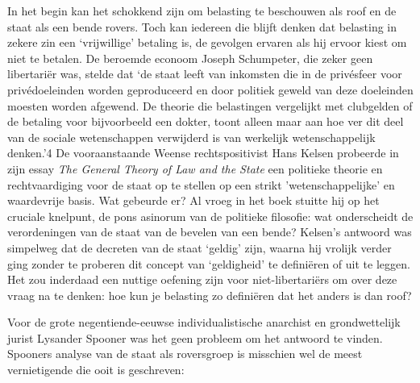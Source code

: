 \documentclass[
  a5paper,
  smalldemyvopaper,10pt,twoside,onecolumn,openright,extrafontsizes,hidelinks]{memoir}
\begin{document}
In het begin kan het schokkend zijn om belasting te beschouwen als roof
en de staat als een bende rovers. Toch kan iedereen die blijft denken
dat belasting in zekere zin een `vrijwillige' betaling is, de gevolgen
ervaren als hij ervoor kiest om niet te betalen. De beroemde econoom
Joseph Schumpeter, die zeker geen libertariër was, stelde dat `de staat
leeft van inkomsten die in de privésfeer voor privédoeleinden worden
geproduceerd en door politiek geweld van deze doeleinden moesten worden
afgewend. De theorie die belastingen vergelijkt met clubgelden of de
betaling voor bijvoorbeeld een dokter, toont alleen maar aan hoe ver dit
deel van de sociale wetenschappen verwijderd is van werkelijk
wetenschappelijk denken.'4 De vooraanstaande Weense rechtspositivist
Hans Kelsen probeerde in zijn essay \emph{The General Theory of Law and
the State} een politieke theorie en rechtvaardiging voor de staat op te
stellen op een strikt 'wetenschappelijke' en waardevrije basis. Wat
gebeurde er? Al vroeg in het boek stuitte hij op het cruciale knelpunt,
de pons asinorum van de politieke filosofie: wat onderscheidt de
verordeningen van de staat van de bevelen van een bende? Kelsen's
antwoord was simpelweg dat de decreten van de staat `geldig' zijn,
waarna hij vrolijk verder ging zonder te proberen dit concept van
`geldigheid' te definiëren of uit te leggen. Het zou inderdaad een
nuttige oefening zijn voor niet-libertariërs om over deze vraag na te
denken: hoe kun je belasting zo definiëren dat het anders is dan roof?

Voor de grote negentiende-eeuwse individualistische anarchist en
grondwettelijk jurist Lysander Spooner was het geen probleem om het
antwoord te vinden. Spooners analyse van de staat als roversgroep is
misschien wel de meest vernietigende die ooit is geschreven:
\end{document}

